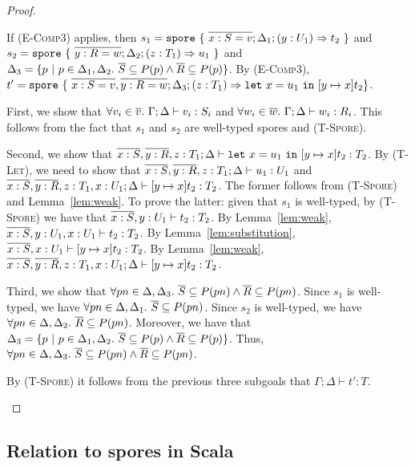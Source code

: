 \begin{proof}
\begin{itemize}
If (\textsc{E-Comp3}) applies, then $s_1 = \texttt{spore}~\{~\overline{x:S=v}; \Delta_1; (y: U_1) \Rightarrow t_2~\}$ and $s_2 = \texttt{spore}~\{~\overline{y:R=w}; \Delta_2; (z: T_1) \Rightarrow u_1~\}$ and $\Delta_3 = \{ p~|~p \in \Delta_1,\Delta_2.~\overline{S} \subseteq P(p) \land \overline{R} \subseteq P(p)\}$. By (\textsc{E-Comp3}), \\ $t' = \texttt{spore}~\{~\overline{x:S=v}, \overline{y:R=w} ; \Delta_3 ; (z: T_1) \Rightarrow \texttt{let}~x = u_1~\texttt{in}~[y \mapsto x]t_2\}$.

First, we show that $\forall v_i \in \overline{v}.~\Gamma ; \Delta \vdash v_i : S_i$ and $\forall w_i \in \overline{w}.~\Gamma ; \Delta \vdash w_i : R_i$. This follows from the fact that $s_1$ and $s_2$ are well-typed spores and (\textsc{T-Spore}).

Second, we show that $\overline{x:S}, \overline{y:R}, z:T_1 ; \Delta \vdash \texttt{let}~x = u_1~\texttt{in}~[y \mapsto x]t_2 : T_2$. By (\textsc{T-Let}), we need to show that $\overline{x:S}, \overline{y:R}, z:T_1 ; \Delta \vdash u_1 : U_1$ and $\overline{x:S}, \overline{y:R}, z:T_1, x:U_1 ; \Delta \vdash [y \mapsto x]t_2 : T_2$. The former follows from (\textsc{T-Spore}) and Lemma~\ref{lem:weak}. To prove the latter: given that $s_1$ is well-typed, by (\textsc{T-Spore}) we have that $\overline{x:S}, y:U_1 \vdash t_2 : T_2$. By Lemma~\ref{lem:weak}, $\overline{x:S}, y:U_1, x:U_1 \vdash t_2 : T_2$. By Lemma~\ref{lem:substitution}, $\overline{x:S}, x:U_1 \vdash [y \mapsto x]t_2 : T_2$. By Lemma~\ref{lem:weak}, $\overline{x:S}, \overline{y:R}, z:T_1, x:U_1 ; \Delta \vdash [y \mapsto x]t_2 : T_2$.

Third, we show that $\forall pn \in \Delta, \Delta_3.~\overline{S} \subseteq P(pn) \land \overline{R} \subseteq P(pn)$. Since $s_1$ is well-typed, we have $\forall pn \in \Delta, \Delta_1.~\overline{S} \subseteq P(pn)$. Since $s_2$ is well-typed, we have $\forall pn \in \Delta, \Delta_2.~\overline{R} \subseteq P(pn)$. Moreover, we have that $\Delta_3 = \{ p~|~p \in \Delta_1,\Delta_2.~\overline{S} \subseteq P(p) \land \overline{R} \subseteq P(p)\}$. Thus, $\forall pn \in \Delta, \Delta_3.~\overline{S} \subseteq P(pn) \land \overline{R} \subseteq P(pn)$.

By (\textsc{T-Spore}) it follows from the previous three subgoals that $\Gamma ; \Delta \vdash t' : T$.

\end{itemize}
\end{proof}


\subsection{Relation to spores in Scala}


